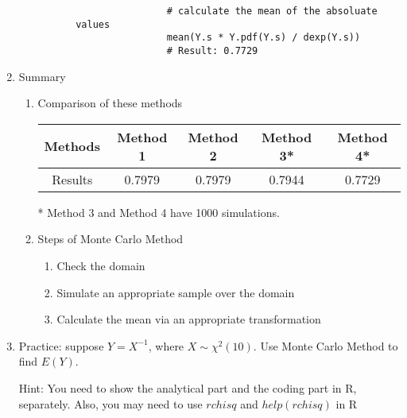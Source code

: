 \documentclass[12pt]{article}
\begin{document}
\begin{enumerate}
\begin{enumerate}
\begin{enumerate}
\begin{itemize}
\begin{verbatim}
				# calculate the mean of the absoluate values
				mean(Y.s * Y.pdf(Y.s) / dexp(Y.s))
				# Result: 0.7729
				\end{verbatim}
			\end{itemize}
		\end{enumerate}
	\end{enumerate}
	\item Summary
	\begin{enumerate}
		\item Comparison of these methods
		\begin{center}
			\begin{tabular}{c | c | c | c | c}
				Methods & Method 1 & Method 2 & Method 3* & Method 4* \\
				\hline
				Results & 0.7979 & 0.7979 & 0.7944 & 0.7729
			\end{tabular}
		\end{center}
		* Method 3 and Method 4 have 1000 simulations.
		\item Steps of Monte Carlo Method
		\begin{enumerate}
			\item Check the domain
			\item Simulate an appropriate sample over the domain 
			\item Calculate the mean via an appropriate transformation
		\end{enumerate}
	\end{enumerate}
	\item Practice: suppose $Y = X^{-1}$, where $X \sim \chi^2(10)$. Use Monte Carlo Method to find $E(Y)$.
	\par Hint: You need to show the analytical part and the coding part in R, separately. Also, you may need to use $rchisq$ and $help(rchisq)$ in R
\end{enumerate}

\newpage
\end{document}
